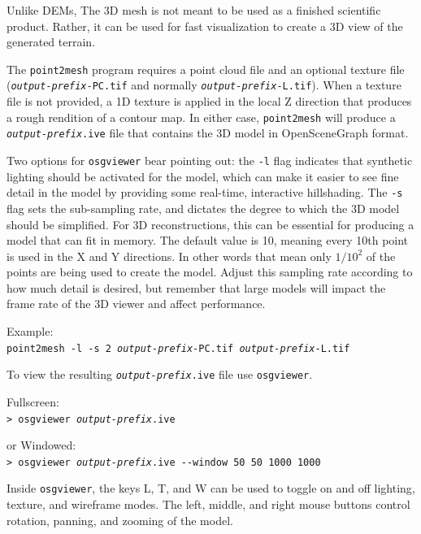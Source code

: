 Unlike \acp{DEM}, The 3D mesh is not meant to be used as a finished
scientific product.  Rather, it can be used for fast visualization
to create a 3D view of the generated terrain.

The \texttt{point2mesh} program requires a point cloud file and an
optional texture file (\texttt{\textit{output-prefix}-PC.tif} and
normally \texttt{\textit{output-prefix}-L.tif}). When a texture
file is not provided, a 1D texture is applied in the local Z direction
that produces a rough rendition of a contour map.  In either case,
\texttt{point2mesh} will produce a \texttt{\textit{output-prefix}.ive}
file that contains the 3D model in OpenSceneGraph format.

Two options for \texttt{osgviewer} bear pointing out: the \texttt{-l}
flag indicates that synthetic lighting should be activated for the
model, which can make it easier to see fine detail in the model by
providing some real-time, interactive hillshading.  The \verb#-s#
flag sets the sub-sampling rate, and dictates the degree to which
the 3D model should be simplified.  For 3D reconstructions, this
can be essential for producing a model that can fit in memory.  The
default value is 10, meaning every 10th point is used in the X and
Y directions. In other words that mean only $1/10^2$ of the points
are being used to create the model. Adjust this sampling rate
according to how much detail is desired, but remember that large
models will impact the frame rate of the 3D viewer and affect
performance.

Example:\\
\hspace*{2em}\texttt{point2mesh -l -s 2 \textit{output-prefix}-PC.tif \textit{output-prefix}-L.tif}

To view the resulting \texttt{\textit{output-prefix}.ive} file use 
\texttt{osgviewer}.

\hspace*{2em}Fullscreen:\\
\hspace*{2em}\texttt{> osgviewer \textit{output-prefix}.ive}

\hspace*{2em}or Windowed:\\
\hspace*{2em}\texttt{> osgviewer \textit{output-prefix}.ive -\/-window 50 50 1000 1000}

Inside \texttt{osgviewer}, the keys L, T, and W can be used to toggle on
and off lighting, texture, and wireframe modes.  The left, middle, and
right mouse buttons control rotation, panning, and zooming of the
model.

